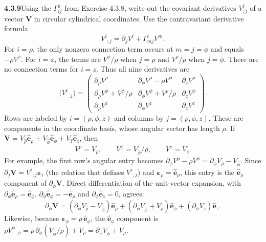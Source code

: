 \par\bigskip
\noindent\textbf{4.3.9}\quad Using the $\Gamma_{ij}^{k}$ from Exercise 4.3.8,
write out the covariant derivatives $V^{i}_{;j}$ of a vector $\mathbf{V}$ in
circular cylindrical coordinates.
\solution
Use the contravariant derivative formula
\[
V^i{}_{;j}=\partial_jV^i+\Gamma^i_{mj}V^m.
\]
For $i=\rho$, the only nonzero connection term occurs at $m=j=\phi$
and equals $-\rho V^\phi$. For $i=\phi$, the terms are
$V^\phi/\rho$ when $j=\rho$ and $V^\rho/\rho$ when $j=\phi$.
There are no connection terms for $i=z$. Thus all nine derivatives are
\[
\boxed{
\bigl(V^i{}_{;j}\bigr)=
\begin{pmatrix}
\partial_\rho V^\rho&\partial_\phi V^\rho-\rho V^\phi&\partial_z V^\rho\\[2pt]
\partial_\rho V^\phi+V^\phi/\rho&
\partial_\phi V^\phi+V^\rho/\rho&\partial_z V^\phi\\[2pt]
\partial_\rho V^z&\partial_\phi V^z&\partial_z V^z
\end{pmatrix}}.
\]
Rows are labeled by $i=(\rho,\phi,z)$ and columns by
$j=(\rho,\phi,z)$. These are components in the coordinate basis, whose
angular vector has length $\rho$. If
$\mathbf V=V_{\hat\rho}\hat{\mathbf e}_\rho+
V_{\hat\phi}\hat{\mathbf e}_\phi+V_{\hat z}\hat{\mathbf e}_z$,
then
\[
V^\rho=V_{\hat\rho},\qquad V^\phi=V_{\hat\phi}/\rho,
\qquad V^z=V_{\hat z}.
\]
For example, the first row's angular entry becomes
$\partial_\phi V^\rho-\rho V^\phi=\partial_\phi V_{\hat\rho}-V_{\hat\phi}$.
Since $\partial_j\mathbf V=V^i{}_{;j}\boldsymbol\varepsilon_i$ (the
relation that defines $V^i{}_{;j}$) and
$\boldsymbol\varepsilon_\rho=\hat{\mathbf e}_\rho$, this entry is the
$\hat{\mathbf e}_\rho$ component of $\partial_\phi\mathbf V$. Direct
differentiation of the unit-vector expansion, with
$\partial_\phi\hat{\mathbf e}_\rho=\hat{\mathbf e}_\phi$,
$\partial_\phi\hat{\mathbf e}_\phi=-\hat{\mathbf e}_\rho$ and
$\partial_\phi\hat{\mathbf e}_z=0$, agrees:
\[
\partial_\phi\mathbf V
=(\partial_\phi V_{\hat\rho}-V_{\hat\phi})\hat{\mathbf e}_\rho
 +(\partial_\phi V_{\hat\phi}+V_{\hat\rho})\hat{\mathbf e}_\phi
 +(\partial_\phi V_{\hat z})\hat{\mathbf e}_z.
\]
Likewise, because $\boldsymbol\varepsilon_\phi=\rho\,\hat{\mathbf e}_\phi$,
the $\hat{\mathbf e}_\phi$ component is
$\rho V^\phi{}_{;\phi}=\rho\,\partial_\phi(V_{\hat\phi}/\rho)+V_{\hat\rho}
=\partial_\phi V_{\hat\phi}+V_{\hat\rho}$.


